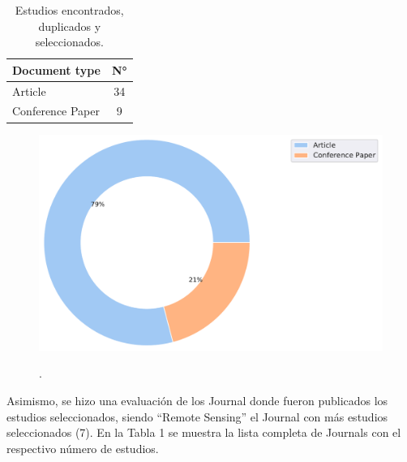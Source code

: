\documentclass{article}
\begin{document}
\begin{table}[H]
    \centering
    \caption{Estudios encontrados, duplicados y seleccionados.}
    \hspace{1cm}
    \label{tab:result}
    \begin{tabularx}{\textwidth}{Xc}
        \hline
        \textbf{Document type} & \textbf{N°} \\ \hline
        Article                & 34          \\
        Conference Paper       & 9           \\  \hline
    \end{tabularx}
\end{table}

\begin{figure}[H]
    \centering
    \includegraphics[width=.65\textwidth]{images/fr_document_type.pdf}
    \label{fig:frog}
    \caption{.}
\end{figure}

Asimismo, se hizo una evaluación de los Journal donde fueron publicados los estudios seleccionados, siendo “Remote Sensing” el Journal con más estudios seleccionados (7). En la Tabla 1 se muestra la lista completa de Journals con el respectivo número de estudios.
\end{document}
